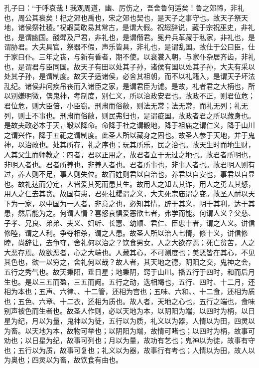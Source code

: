 \documentclass[]{article}
\begin{document}
孔子曰：``于呼哀哉！我观周道，幽、厉伤之，吾舍鲁何适矣！鲁之郊禘，非礼也，周公其衰矣！杞之郊也禹也，宋之郊也契也，是天子之事守也。故天子祭天地，诸侯祭社稷。''祝嘏莫敢易其常古，是谓大假。祝嘏辞说，藏于宗祝巫史，非礼也，是谓幽国。醆斝及尸君，非礼也，是谓僭君。冕弁兵革藏于私家，非礼也，是谓胁君。大夫具官，祭器不假，声乐皆具，非礼也，是谓乱国。故仕于公曰臣，仕于家曰仆。三年之丧，与新有昏者，期不使。以衰裳入朝，与家仆杂居齐齿，非礼也，是谓君与臣同国。故天子有田以处其子孙，诸侯有国以处其子孙，大夫有采以处其子孙，是谓制度。故天子适诸侯，必舍其祖朝，而不以礼籍入，是谓天子坏法乱纪。诸侯非问疾吊丧而入诸臣之家，是谓君臣为谑。是故，礼者君之大柄也，所以别嫌明微，傧鬼神，考制度，别仁义，所以治政安君也。故政不正，则君位危；君位危，则大臣倍，小臣窃。刑肃而俗敝，则法无常；法无常，而礼无列；礼无列，则士不事也。刑肃而俗敝，则民弗归也，是谓疵国。故政者君之所以藏身也。是故夫政必本于天，殽以降命。命降于社之谓殽地，降于祖庙之谓仁义，降于山川之谓兴作，降于五祀之谓制度。此圣人所以藏身之固也。故圣人参于天地，并于鬼神，以治政也。处其所存，礼之序也；玩其所乐，民之治也。故天生时而地生财，人其父生而师教之：四者，君以正用之，故君者立于无过之地也。故君者所明也，非明人者也。君者所养也，非养人者也。君者所事也，非事人者也。故君明人则有过，养人则不足，事人则失位。故百姓则君以自治也，养君以自安也，事君以自显也。故礼达而分定，人皆爱其死而患其生。故用人之知去其诈，用人之勇去其怒，用人之仁去其贪。故国有患，君死社稷谓之义，大夫死宗庙谓之变。故圣人耐以天下为一家，以中国为一人者，非意之也，必知其情，辟于其义，明于其利，达于其患，然后能为之。何谓人情？喜怒哀惧爱恶欲七者，弗学而能。何谓人义？父慈、子孝、兄良、弟弟、夫义、妇听、长惠、幼顺、君仁、臣忠十者，谓之人义。讲信修睦，谓之人利。争夺相杀，谓之人患。故圣人所以治人七情，修十义，讲信修睦，尚辞让，去争夺，舍礼何以治之？饮食男女，人之大欲存焉；死亡贫苦，人之大恶存焉。故欲恶者，心之大端也。人藏其心，不可测度也；美恶皆在其心，不见其色也，欲一以穷之，舍礼何以哉？故人者，其天地之德，阴阳之交，鬼神之会，五行之秀气也。故天秉阳，垂日星；地秉阴，窍于山川。播五行于四时，和而后月生也。是以三五而盈，三五而阙。五行之动，迭相竭也，五行、四时、十二月，还相为本也；五声、六律、、十二管，还相为宫也；五味、六和、、十二食，还相为质也；五色、六章、十二衣，还相为质也。故人者，天地之心也，五行之端也，食味别声被色而生者也。故圣人作则，必以天地为本，以阴阳为端，以四时为柄，以日星为纪，月以为量，鬼神以为徒，五行以为质，礼义以为器，人情以为田，四灵以为畜。以天地为本，故物可举也；以阴阳为端，故情可睹也；以四时为柄，故事可劝也；以日星为纪，故事可列也；月以为量，故功有艺也；鬼神以为徒，故事有守也；五行以为质，故事可复也；礼义以为器，故事行有考也；人情以为田，故人以为奥也；四灵以为畜，故饮食有由也。
\end{document}

